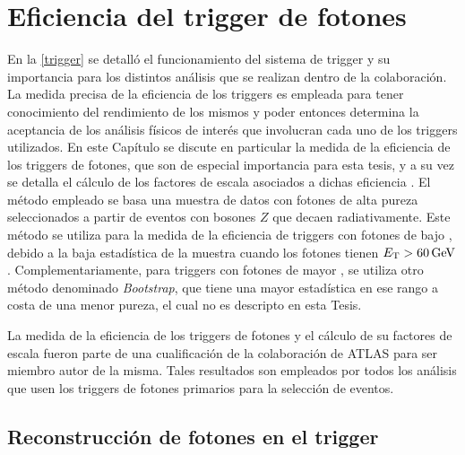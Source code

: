 \chapter{Eficiencia del trigger de fotones}


En la \autoref{trigger} se detalló el funcionamiento del sistema de trigger y su importancia para los distintos análisis que se realizan dentro de la colaboración. La medida precisa de la eficiencia de los triggers es empleada para tener conocimiento del rendimiento de los mismos y poder entonces determina la aceptancia de los análisis físicos de interés que involucran cada uno de los triggers utilizados. 
En este Capítulo se discute en particular la medida de la eficiencia de los triggers de fotones, que son de especial importancia para esta tesis, y a su vez se detalla el cálculo de los factores de escala asociados a dichas eficiencia . El método empleado se basa una muestra de datos con fotones de alta pureza seleccionados a partir de eventos con bosones $Z$ que decaen radiativamente. Este método se utiliza para la medida de la eficiencia de triggers con fotones de bajo \ET, debido a la baja estadística de la muestra cuando los fotones tienen $E_{\text{T}}>60\,\text{GeV}$. Complementariamente, para triggers con fotones de mayor \ET, se utiliza otro método denominado \textit{Bootstrap}, que tiene una mayor estadística en ese rango a costa de una menor pureza, el cual no es descripto en esta Tesis.

La medida de la eficiencia de los triggers de fotones y el cálculo de su factores de escala fueron parte de una cualificación de la colaboración de ATLAS para ser miembro autor de la misma. Tales resultados son empleados por todos los análisis que usen los triggers de fotones primarios para la selección de eventos.



\section{Reconstrucción de fotones en el trigger}

